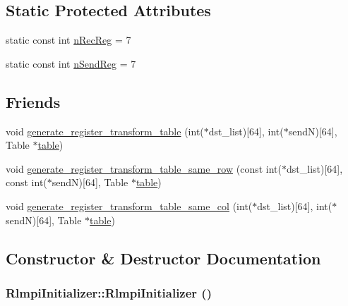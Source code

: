 \subsection*{Static Protected Attributes}
\begin{DoxyCompactItemize}
\item 
static const int \hyperlink{classRlmpiInitializer_a1024dd75bf6112088498f5686d9a465a}{nRecReg} = 7
\item 
static const int \hyperlink{classRlmpiInitializer_a82293c30e770d8ac62c3a2c36cc4a46f}{nSendReg} = 7
\end{DoxyCompactItemize}
\subsection*{Friends}
\begin{DoxyCompactItemize}
\item 
void \hyperlink{classRlmpiInitializer_aa9cca8e4d882112207c34b03bf945a20}{generate\_\-register\_\-transform\_\-table} (int($\ast$dst\_\-list)\mbox{[}64\mbox{]}, int($\ast$sendN)\mbox{[}64\mbox{]}, Table $\ast$\hyperlink{classRlmpiInitializer_a11c91777026788de0ec214104d18f4dd}{table})
\item 
void \hyperlink{classRlmpiInitializer_af5b98639ee3f637ee3b94b890a8f8ea1}{generate\_\-register\_\-transform\_\-table\_\-same\_\-row} (const int($\ast$dst\_\-list)\mbox{[}64\mbox{]}, const int($\ast$sendN)\mbox{[}64\mbox{]}, Table $\ast$\hyperlink{classRlmpiInitializer_a11c91777026788de0ec214104d18f4dd}{table})
\item 
void \hyperlink{classRlmpiInitializer_ac67b230ec20837a9ead28023dcfe7332}{generate\_\-register\_\-transform\_\-table\_\-same\_\-col} (int($\ast$dst\_\-list)\mbox{[}64\mbox{]}, int($\ast$sendN)\mbox{[}64\mbox{]}, Table $\ast$\hyperlink{classRlmpiInitializer_a11c91777026788de0ec214104d18f4dd}{table})
\end{DoxyCompactItemize}


\subsection{Constructor \& Destructor Documentation}
\hypertarget{classRlmpiInitializer_a658d6a4ceeadcc2101eea81790fe02a9}{
\subsubsection[{RlmpiInitializer}]{\setlength{\rightskip}{0pt plus 5cm}RlmpiInitializer::RlmpiInitializer ()}}
\label{classRlmpiInitializer_a658d6a4ceeadcc2101eea81790fe02a9}


